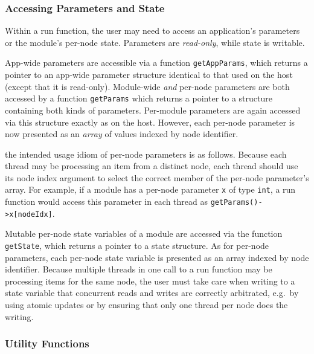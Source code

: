 \documentclass[11pt]{article}
\begin{document}
\subsubsection{Accessing Parameters and State}

Within a run function, the user may need to access an application's
parameters or the module's per-node state.  Parameters are
\emph{read-only}, while state is writable.

App-wide parameters are accessible via a function
\texttt{getAppParams}, which returns a pointer to an app-wide
parameter structure identical to that used on the host (except that it
is read-only).  Module-wide \emph{and} per-node parameters are both
accessed by a function \texttt{getParams} which returns a pointer to a
structure containing both kinds of parameters.  Per-module parameters
are again accessed via this structure exactly as on the host.  However,
each per-node parameter is now presented as an \emph{array} of values
indexed by node identifier.

the intended usage idiom of per-node parameters is as follows.
Because each thread may be processing an item from a distinct node,
each thread should use its node index argument to select the correct
member of the per-node parameter's array.  For example, if a module
has a per-node parameter \texttt{x} of type \texttt{int}, a run
function would access this parameter in each thread as
\texttt{getParams()->x[nodeIdx]}.

Mutable per-node state variables of a module are accessed via the
function \texttt{getState}, which returns a pointer to a state
structure.  As for per-node parameters, each per-node state variable
is presented as an array indexed by node identifier.  Because multiple
threads in one call to a run function may be processing items for the
same node, the user must take care when writing to a state variable
that concurrent reads and writes are correctly arbitrated, e.g.\ by
using atomic updates or by ensuring that only one thread per node does
the writing.


\subsubsection{Utility Functions}
\end{document}
